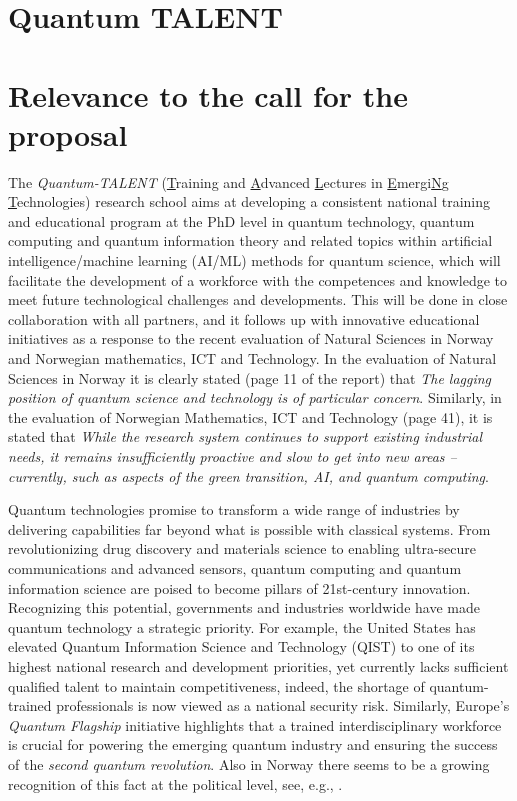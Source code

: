 \documentclass{scrreprt}
\author{Oslo Metropolitan University}
\date{\today}
\title{}
\begin{document}
\section*{\LARGE{Quantum TALENT}}





\section{Relevance to the call for the proposal}

The \textit{Quantum-TALENT} (\underline{T}raining and \underline{A}dvanced
\underline{L}ectures in \underline{E}mergi\underline{N}g
\underline{T}echnologies) research school aims at developing a consistent national training and
educational program at the PhD level in quantum technology, quantum
computing and quantum information theory and related topics within  artificial
intelligence/machine learning (AI/ML) methods for quantum science,
which will facilitate the development of a workforce with the
competences and knowledge to meet future technological challenges and
developments. This will  be done in close collaboration with all
partners, and it follows up with innovative educational initiatives  as a response to the recent evaluation of Natural Sciences in Norway and Norwegian mathematics, ICT and Technology\cite{evalnat,evalmat}.  In the evaluation of Natural Sciences in Norway \cite{evalnat} it is clearly stated (page 11 of the report) that \textit{The lagging
position of quantum science and technology is of particular concern}.  Similarly, in the evaluation of Norwegian Mathematics, ICT and Technology \cite{evalmat} (page 41), it is stated that \textit{While the research system continues to support existing industrial needs, it remains insufficiently proactive and slow to get into new areas – currently, such as aspects of the green transition, AI, and quantum computing}. 

Quantum technologies promise to transform a wide range of industries
by delivering capabilities far beyond what is possible with classical
systems. From revolutionizing drug discovery and materials science to
enabling ultra-secure communications and advanced sensors, quantum
computing and quantum information science are poised to become pillars
of 21st-century innovation. Recognizing this potential, governments
and industries worldwide have made quantum technology a strategic
priority. For example, the United States has elevated Quantum
Information Science and Technology (QIST) \cite{usquantum} to one of its highest
national research and development priorities, yet currently lacks
sufficient qualified talent to maintain competitiveness, indeed, the
shortage of quantum-trained professionals is now viewed as a national
security risk. Similarly, Europe’s \textit{Quantum Flagship} \cite{euquantum}
initiative highlights that a trained interdisciplinary workforce is crucial for powering
the emerging quantum industry and ensuring the success of the {\em
  second quantum revolution}.
Also in Norway there seems to be a growing recognition of this fact at the political level, see, e.g., \cite{StM14}.
\end{document}
